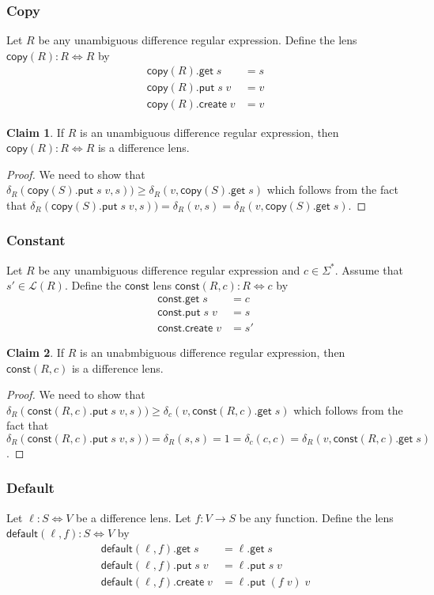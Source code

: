 \documentclass[acmsmall,review,anonymous]{acmart}\settopmatter{printfolios=true,printccs=false,printacmref=false}
\theoremstyle{definition}
\newtheorem{claim}{Claim}
\newcommand{\kw}[1]{\ensuremath{\mathsf{#1}}\xspace}
\newcommand{\get}{\ensuremath{\kw{get}}\xspace}
\newcommand{\pput}{\ensuremath{\kw{put}}\xspace}
\newcommand{\create}{\ensuremath{\kw{create}}\xspace}
\newcommand{\ccopy}{\ensuremath{\kw{copy}}\xspace}
\newcommand{\const}{\ensuremath{\kw{const}}\xspace}
\newcommand{\default}{\ensuremath{\kw{default}}\xspace}
\begin{document}
\subsubsection{Copy}
Let $R$ be any unambiguous difference regular expression. Define the lens $\ccopy(R) : R \Leftrightarrow R$ by
\begin{align}
\ccopy(R).\get \; s &= s\\
\ccopy(R).\pput \; s \; v &= v\\
\ccopy(R).\create \; v &= v
\end{align}
\begin{claim}
If $R$ is an unambiguous difference regular expression, then $\ccopy(R) : R \Leftrightarrow R$ is a difference lens.
\end{claim}
\begin{proof}
We need to show that $\delta_R(\ccopy(S).\pput
\; s \; v, s)) \geq \delta_R(v, \ccopy(S).\get \; s)$ which follows from the fact that $\delta_R(\ccopy(S).\pput \; s
\; v, s)) = \delta_R(v, s) = \delta_R(v, \ccopy(S).\get \; s) $.
\end{proof}
\subsubsection{Constant}
Let $R$ be any unambiguous difference regular expression and $c \in \Sigma^*$. Assume that $s' \in \mathcal{L}(R)$. Define the \const lens $\const(R, c) : R
\Leftrightarrow c$ by
\begin{align*}
\const.\get \; s &= c\\
\const.\pput \; s \; v &= s\\
\const.\create \; v &= s'
\end{align*}
\begin{claim}
If $R$ is an unabmbiguous difference regular expression, then $\const(R, c)$ is a difference lens.
\end{claim}
\begin{proof}
We need to show that $\delta_R(\const(R, c).\pput
\; s \; v, s)) \geq \delta_c(v, \const(R, c).\get \; s)$ which follows from the fact that $\delta_R(\const(R, c).\pput
\; s \; v, s)) = \delta_R(s, s) = 1 = \delta_c(c, c) = \delta_R(v, \const(R, c).\get \; s)$.
\end{proof}

\subsubsection{Default}
Let $\ell : S \Leftrightarrow V$ be a difference lens. Let $f :
V \longrightarrow S$ be any function. Define the lens $\default(\ell, f) :
S \Leftrightarrow V$ by
\begin{align*}
\default(\ell, f).\get \; s &= \ell.\get \; s\\
\default(\ell, f).\pput \; s \; v &= \ell.\pput \; s \; v\\
\default(\ell, f).\create \; v &= \ell.\pput \; (f \; v) \; v
\end{align*}
 
\end{document}
